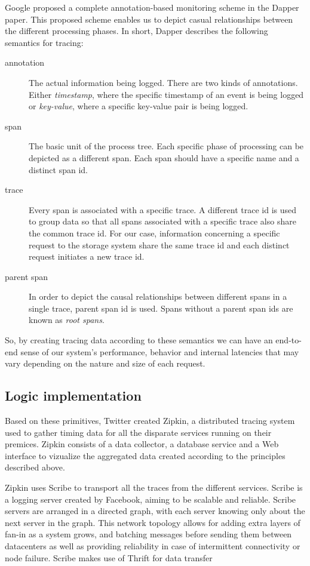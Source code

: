 \documentclass[a4paper,10pt,twocolumn]{article}
\begin{document}
Google proposed a complete annotation-based monitoring scheme in the Dapper 
paper\cite{dapper}. This proposed scheme enables us to depict casual
relationships between the different processing phases. In short, Dapper 
describes the following semantics for tracing:
\begin{description}
\item[annotation]
The actual information being logged. There are two kinds of annotations. Either
\emph{timestamp}, where the specific timestamp of an event is being logged or 
\emph{key-value}, where a specific key-value pair is being logged.
\item[span]
The basic unit of the process tree. Each specific phase of processing can be 
depicted as a different span. Each span should have a specific name and a 
distinct span id.
\item[trace]
Every span is associated with a specific trace. A different trace id is used 
to group data so that all spans associated with a specific trace also share the
common trace id. For our case, information concerning a specific request to the
storage system share the same trace id and each distinct request initiates a new
trace id.
\item[parent span] 
In order to depict the causal relationships between different spans in a single
trace, parent span id is used. Spans without a parent span ids are  known as 
\emph{root spans}.
\end{description}

So, by creating tracing data according to these semantics we can have an 
end-to-end sense of our system's performance, behavior and internal latencies
that may vary depending on the nature and size of each request.

\subsection{Logic implementation}
Based on these primitives, Twitter created Zipkin\cite{zipkin}, a distributed
tracing system used to gather timing data for all the disparate services 
running on their premices. Zipkin consists of a data collector, a database 
service and a Web interface to vizualize the aggregated data created according 
to the principles described above.

Zipkin uses Scribe\cite{scribe} to transport all the traces from the different
services. Scribe is a logging server created by Facebook, aiming to be scalable
and reliable. Scribe servers are arranged in a directed graph, with each server
knowing only about the next server in the graph. This network topology allows
for adding extra layers of fan-in as a system grows, and batching messages
before sending them between datacenters as well as providing reliability in case
of intermittent connectivity or node failure. Scribe makes use of 
Thrift\cite{thift} for data transfer
\end{document}

